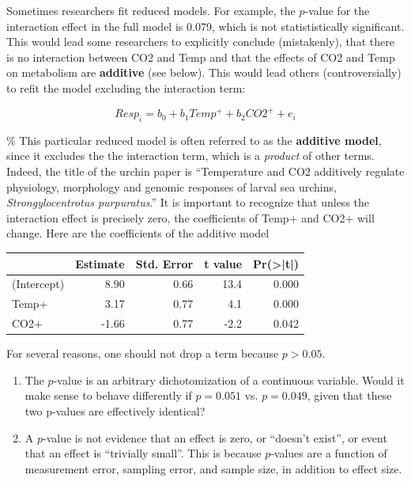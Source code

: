 \documentclass[]{book}
\providecommand{\tightlist}{%
  \setlength{\itemsep}{0pt}\setlength{\parskip}{0pt}}
\theoremstyle{definition}
\theoremstyle{definition}
\theoremstyle{definition}
\theoremstyle{remark}
\begin{document}
Sometimes researchers fit reduced models. For example, the \(p\)-value
for the interaction effect in the full model is 0.079, which is not
statististically significant. This would lead some researchers to
explicitly conclude (mistakenly), that there is no interaction between
CO2 and Temp and that the effects of CO2 and Temp on metabolism are
\textbf{additive} (see below). This would lead others (controversially)
to refit the model excluding the interaction term:

\begin{equation}
Resp_i = b_0 + b_1Temp^+ + b_2CO2^+ + e_i
\end{equation}

\% This particular reduced model is often referred to as the
\textbf{additive model}, since it excludes the the interaction term,
which is a \emph{product} of other terms. Indeed, the title of the
urchin paper is ``Temperature and CO2 additively regulate physiology,
morphology and genomic responses of larval sea urchins,
\emph{Strongylocentrotus purpuratus}.'' It is important to recognize
that unless the interaction effect is precisely zero, the coefficients
of Temp+ and CO2+ will change. Here are the coefficients of the additive
model

\begin{tabular}{l|r|r|r|r}
\hline
  & Estimate & Std. Error & t value & Pr(>|t|)\\
\hline
(Intercept) & 8.90 & 0.66 & 13.4 & 0.000\\
\hline
Temp+ & 3.17 & 0.77 & 4.1 & 0.000\\
\hline
CO2+ & -1.66 & 0.77 & -2.2 & 0.042\\
\hline
\end{tabular}

For several reasons, one should not drop a term because \(p>0.05\).

\begin{enumerate}
\def\labelenumi{\arabic{enumi}.}
\tightlist
\item
  The \(p\)-value is an arbitrary dichotomization of a continuous
  variable. Would it make sense to behave differently if \(p=0.051\) vs.
  \(p=0.049\), given that these two p-values are effectively identical?
\item
  A \(p\)-value is not evidence that an effect is zero, or ``doesn't
  exist'', or event that an effect is ``trivially small''. This is
  because \(p\)-values are a function of measurement error, sampling
  error, and sample size, in addition to effect size.
\end{enumerate}
\end{document}
